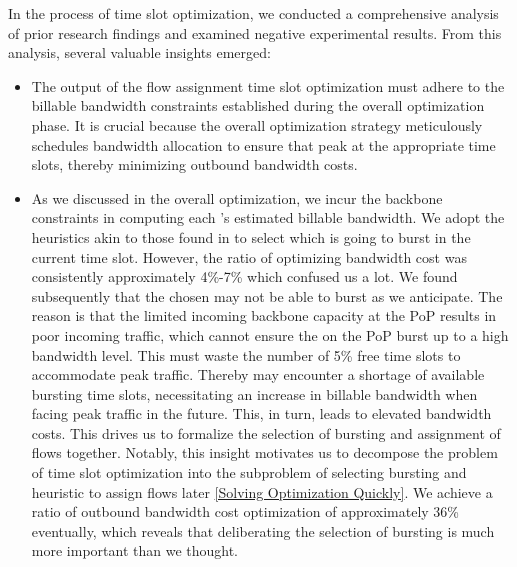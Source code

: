 {In the process of time slot optimization, we conducted a comprehensive analysis of prior research findings and examined negative experimental results. From this analysis, several valuable insights emerged:}
\begin{itemize}
\item {} The output of the flow assignment time slot optimization must adhere to the billable bandwidth constraints established during the overall optimization phase. It is crucial because the overall optimization strategy meticulously schedules bandwidth allocation to ensure that {\egresses} peak at the appropriate time slots, thereby minimizing outbound bandwidth costs.

\item {}
As we discussed in the overall optimization, we incur the backbone constraints in computing each {\egress}'s estimated billable bandwidth. We adopt the heuristics akin to those found in \cite{singh2021costCascara,goldenberg2004optimizing} to select which {\egresses} is going to burst in the current time slot. However, the ratio of optimizing bandwidth cost was consistently approximately 4\%-7\% which confused us a lot. We found subsequently that the chosen {\egresses} may not be able to burst as we anticipate. The reason is that the limited incoming backbone capacity at the PoP results in poor incoming traffic, which cannot ensure the {\egresses} on the PoP burst up to a high bandwidth level. This must waste the number of 5\% free time slots to accommodate peak traffic. Thereby {\egresses} may encounter a shortage of available bursting time slots, necessitating an increase in billable bandwidth when facing peak traffic in the future. This, in turn, leads to elevated bandwidth costs. This drives us to formalize the selection of bursting {\egresses} and assignment of flows together. Notably, this insight motivates us to decompose the problem of time slot optimization into the subproblem of selecting bursting {\egresses} and heuristic to assign flows later \ref{Solving Optimization Quickly}. We achieve a ratio of outbound bandwidth cost optimization of approximately 36\% eventually, which reveals that deliberating the selection of bursting {\egresses} is much more important than we thought.

\end{itemize}

